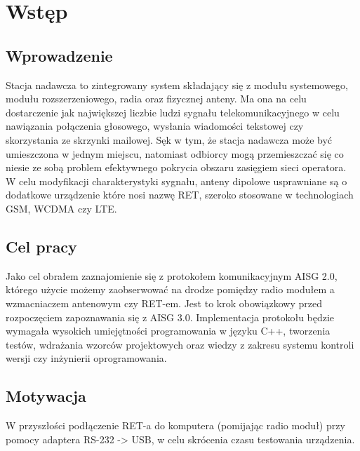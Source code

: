 \tableofcontents

\chapter{Wstęp}
\section{Wprowadzenie}
	Stacja nadawcza to zintegrowany system składający się z modułu systemowego, modułu rozszerzeniowego, radia oraz fizycznej anteny. 
	Ma ona na celu dostarczenie jak największej liczbie ludzi sygnału telekomunikacyjnego w celu nawiązania połączenia głosowego, 
	wysłania wiadomości tekstowej czy skorzystania ze skrzynki mailowej. Sęk w tym, że stacja nadawcza może być umieszczona w jednym miejscu, 
	natomiast odbiorcy mogą przemieszczać się co niesie ze sobą problem efektywnego pokrycia obszaru zasięgiem sieci operatora.
	W celu modyfikacji charakterystyki sygnału, anteny dipolowe usprawniane są o dodatkowe urządzenie 
	które nosi nazwę RET, szeroko stosowane w technologiach GSM, WCDMA czy LTE.

\section{Cel pracy}
	Jako cel obrałem zaznajomienie się z protokołem komunikacyjnym AISG 2.0, którego użycie możemy zaobserwować na drodze pomiędzy 
	radio modułem a wzmacniaczem antenowym czy RET-em. 
	Jest to krok obowiązkowy przed rozpoczęciem zapoznawania się z AISG 3.0.
	Implementacja protokołu będzie wymagała wysokich umiejętności programowania w języku C++, 
	tworzenia testów, wdrażania wzorców projektowych oraz wiedzy z zakresu systemu kontroli wersji czy inżynierii oprogramowania.

\section{Motywacja}
	W przyszłości podłączenie RET-a do komputera (pomijając radio moduł) przy pomocy adaptera RS-232 -> USB, w celu skrócenia czasu testowania urządzenia.
